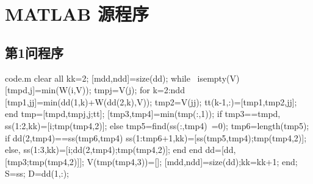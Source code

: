 \section{MATLAB 源程序}

\renewcommand{\thesubsection}{A\thinskip.\thinskip\arabic{subsection}}

\subsection{第1问程序}
\vspace{-2ex}

\begin{Matlab}{code.m}
clear all
kk=2;
[mdd,ndd]=size(dd);
while ~isempty(V)
    [tmpd,j]=min(W(i,V));
    tmpj=V(j);
    for k=2:ndd
        [tmp1,jj]=min(dd(1,k)+W(dd(2,k),V));
        tmp2=V(jj);
        tt(k-1,:)=[tmp1,tmp2,jj];
    end
    tmp=[tmpd,tmpj,j;tt];
    [tmp3,tmp4]=min(tmp(:,1));
    if tmp3==tmpd,
        ss(1:2,kk)=[i;tmp(tmp4,2)];
    else
        tmp5=find(ss(:,tmp4)~=0);
        tmp6=length(tmp5);
        if dd(2,tmp4)==ss(tmp6,tmp4)
            ss(1:tmp6+1,kk)=[ss(tmp5,tmp4);tmp(tmp4,2)];
        else, ss(1:3,kk)=[i;dd(2,tmp4);tmp(tmp4,2)];
        end
    end
    dd=[dd,[tmp3;tmp(tmp4,2)]];
    V(tmp(tmp4,3))=[];
    [mdd,ndd]=size(dd);kk=kk+1;
end;
S=ss; D=dd(1,:);
\end{Matlab}
\vspace{2ex}

\clearpage

